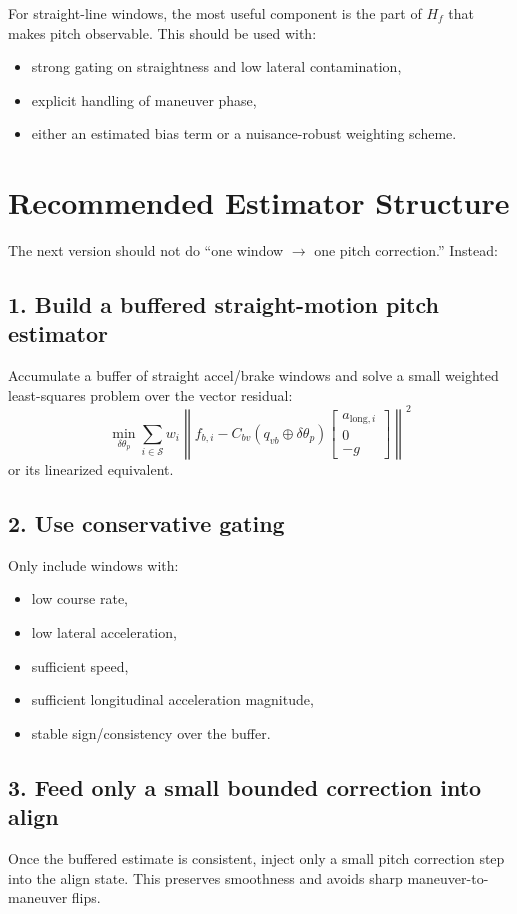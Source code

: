 \documentclass[11pt]{article}
\begin{document}
For straight-line windows, the most useful component is the part of \(H_f\) that makes pitch observable. This should be used with:
\begin{itemize}[leftmargin=1.5em]
\item strong gating on straightness and low lateral contamination,
\item explicit handling of maneuver phase,
\item either an estimated bias term or a nuisance-robust weighting scheme.
\end{itemize}

\section{Recommended Estimator Structure}
The next version should not do ``one window \(\rightarrow\) one pitch correction.'' Instead:

\subsection{1. Build a buffered straight-motion pitch estimator}
Accumulate a buffer of straight accel/brake windows and solve a small weighted least-squares problem over the vector residual:
\[
\min_{\delta \theta_p}
\sum_{i \in \mathcal{S}}
w_i
\left\|
f_{b,i} - C_{bv}(q_{vb} \oplus \delta \theta_p)
\begin{bmatrix}
a_{\text{long},i} \\
0 \\
-g
\end{bmatrix}
\right\|^2
\]
or its linearized equivalent.

\subsection{2. Use conservative gating}
Only include windows with:
\begin{itemize}[leftmargin=1.5em]
\item low course rate,
\item low lateral acceleration,
\item sufficient speed,
\item sufficient longitudinal acceleration magnitude,
\item stable sign/consistency over the buffer.
\end{itemize}

\subsection{3. Feed only a small bounded correction into align}
Once the buffered estimate is consistent, inject only a small pitch correction step into the align state. This preserves smoothness and avoids sharp maneuver-to-maneuver flips.
\end{document}
